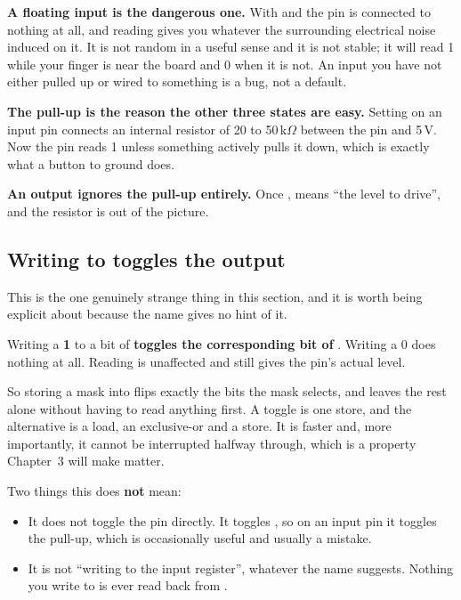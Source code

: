 
\textbf{A floating input is the dangerous one.} With  and  the pin
is connected to nothing at all, and reading  gives you whatever the surrounding
electrical noise induced on it. It is not random in a useful sense and it is not stable; it will
read 1 while your finger is near the board and 0 when it is not. An input you have not either
pulled up or wired to something is a bug, not a default.

\textbf{The pull-up is the reason the other three states are easy.} Setting  on an
input pin connects an internal resistor of 20 to 50\,k$\Omega$ between the pin and 5\,V. Now the
pin reads 1 unless something actively pulls it down, which is exactly what a button to ground
does.

\textbf{An output ignores the pull-up entirely.} Once ,  means ``the
level to drive'', and the resistor is out of the picture.

\subsection{Writing to  toggles the output}
\label{c2:sec:toggle}
This is the one genuinely strange thing in this section, and it is worth being explicit about
because the name gives no hint of it.

Writing a \textbf{1} to a bit of  \textbf{toggles the corresponding bit of
}. Writing a 0 does nothing at all. Reading  is unaffected and still gives
the pin's actual level.

So storing a mask into  flips exactly the bits the mask selects, and leaves the rest
alone without having to read anything first. A toggle is one store, and the alternative is a load,
an exclusive-or and a store. It is faster and, more importantly, it cannot be interrupted halfway
through, which is a property Chapter~3 will make matter.

Two things this does \textbf{not} mean:
\begin{itemize}
  \item It does not toggle the pin directly. It toggles , so on an input pin it toggles
    the pull-up, which is occasionally useful and usually a mistake.
  \item It is not ``writing to the input register'', whatever the name suggests. Nothing you write
    to  is ever read back from .
\end{itemize}

